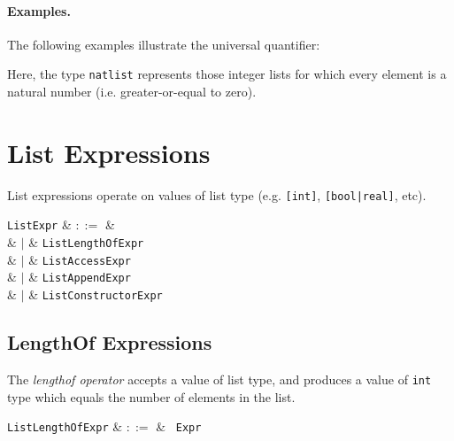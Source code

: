 \paragraph{Examples.}  The following examples illustrate the universal quantifier:



Here, the type \lstinline{natlist} represents those integer lists for which every element is a natural number (i.e. greater-or-equal to zero).


\section{List Expressions}
\label{c_expr_list}

List expressions operate on values of list type (e.g. \lstinline{[int]}, \lstinline{[bool|real]}, etc).

\begin{syntax}
  \verb+ListExpr+ & $::=$ &\\
  & $|$ & \verb+ListLengthOfExpr+\\
  & $|$ & \verb+ListAccessExpr+\\
  & $|$ & \verb+ListAppendExpr+\\
  & $|$ & \verb+ListConstructorExpr+\\
\end{syntax}


\subsection{LengthOf Expressions}
\label{c_expr_lengthof}

The {\em lengthof operator} accepts a value of list type, and produces a value of \lstinline{int} type which equals the number of elements in the list.

\begin{syntax}
\verb+ListLengthOfExpr+ & $::=$ & \token{|}\ \verb+Expr+\ \token{|}\\
\end{syntax}


